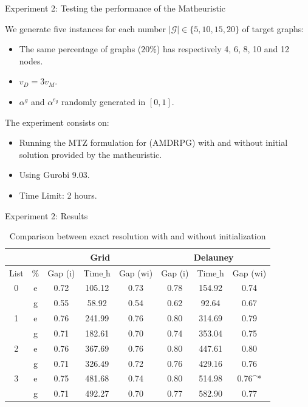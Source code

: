 \documentclass[slidestop,usepdftitle=false,10pt]{beamer}
\begin{document}
	\begin{frame}{Experiment 2: Testing the performance of the Matheuristic}
	
    We generate five instances for each number $|\mathcal G|\in\{5, 10, 15, 20\}$ of target graphs:
    \begin{itemize}
        \item The same percentage of graphs ($20\%$) has respectively 4, 6, 8, 10 and 12 nodes.
        \item $v_D= 3v_M$.
        \item $\alpha^g$ and $\alpha^{e_g}$ randomly generated in $[0, 1]$.
    \end{itemize}
    
    The experiment consists on:
    \begin{itemize}
        \item Running the MTZ formulation for (AMDRPG) with and without initial solution provided by the matheuristic.
        \item Using Gurobi 9.03.
        \item Time Limit: 2 hours.
    \end{itemize}
	    
	\end{frame}
	
	\begin{frame}{Experiment 2: Results}
    \renewcommand{\arraystretch}{0.7}
    \begin{table}[!h]
    \caption{Comparison between exact resolution with and without initialization}
    \centering
    \footnotesize
    \begin{tabular}{c c | c c c | c c c}
    \hline
     &  & \multicolumn{3}{c}{\textbf{Grid}} &  \multicolumn{3}{c}{\textbf{Delauney}} \\
    \hline
     List &  $\%$  & Gap (i) & Time$\_$h & Gap (wi)  & Gap (i) & Time$\_$h & Gap (wi)\\
    \hline
    \multirow{}{}{0} & e & 0.72 & 105.12 & 0.73 & 0.78 & 154.92 & 0.74\\
    & g & 0.55 & 58.92 & 0.54 & 0.62 & 92.64 & 0.67\\
    \hline
    \multirow{}{}{1} & e & 0.76 & 241.99 & 0.76 & 0.80 & 314.69 & 0.79\\
    & g & 0.71 & 182.61 & 0.70 & 0.74 & 353.04 & 0.75\\
    \hline
    \multirow{}{}{2} & e & 0.76 & 367.69 & 0.76 & 0.80 & 447.61 & 0.80 \\
    & g & 0.71 & 326.49 & 0.72 & 0.76 & 429.16 & 0.76\\
    \hline
    \multirow{}{}{3} & e & 0.75 & 481.68 & 0.74 & 0.80 & 514.98 & 0.76^*\\
    & g & 0.71 & 492.27 & 0.70 & 0.77 & 582.90 & 0.77\\
        \hline
    \end{tabular}
    \label{table:tab4}
    \end{table}
	\end{frame}
	
\end{document}
